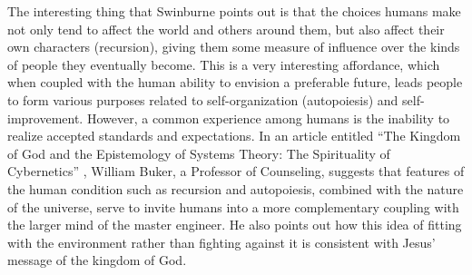 The
interesting thing that Swinburne points out is that the choices humans
make not only tend to affect the world and others around them, but also
affect their own characters (recursion), giving them some measure of
influence over the kinds of people they eventually become. This is a
very interesting affordance, which when coupled with the human ability
to envision a preferable future, leads people to form various purposes
related to self-organization (autopoiesis) and self-improvement.
However, a common experience among humans is the inability to realize
accepted standards and expectations. In an article entitled “The
Kingdom of God and the Epistemology of Systems Theory: The Spirituality
of Cybernetics” \citep{buker2009}, William Buker, a Professor of
Counseling, suggests that features of the human condition such as
recursion and autopoiesis, combined with the nature of the universe,
serve to invite humans into a more complementary coupling with the
larger mind of the master engineer. He also points out how this idea of
fitting with the environment rather than fighting against it is
consistent with Jesus’ message of the kingdom of God.

